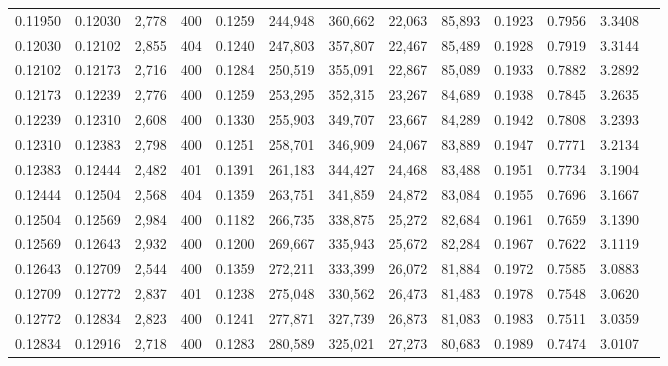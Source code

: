 \begin{tabular}{rrrrrrrrrrrrr}
0.11950 & 0.12030 & 2,778 & 400 &                                     0.1259 & 244,948 & 360,662 &  22,063 &  85,893 & 0.1923 & 0.7956 & 3.3408 \\
0.12030 & 0.12102 & 2,855 & 404 &                                     0.1240 & 247,803 & 357,807 &  22,467 &  85,489 & 0.1928 & 0.7919 & 3.3144 \\
0.12102 & 0.12173 & 2,716 & 400 &                                     0.1284 & 250,519 & 355,091 &  22,867 &  85,089 & 0.1933 & 0.7882 & 3.2892 \\
0.12173 & 0.12239 & 2,776 & 400 &                                     0.1259 & 253,295 & 352,315 &  23,267 &  84,689 & 0.1938 & 0.7845 & 3.2635 \\
0.12239 & 0.12310 & 2,608 & 400 &                                     0.1330 & 255,903 & 349,707 &  23,667 &  84,289 & 0.1942 & 0.7808 & 3.2393 \\
0.12310 & 0.12383 & 2,798 & 400 &                                     0.1251 & 258,701 & 346,909 &  24,067 &  83,889 & 0.1947 & 0.7771 & 3.2134 \\
0.12383 & 0.12444 & 2,482 & 401 &                                     0.1391 & 261,183 & 344,427 &  24,468 &  83,488 & 0.1951 & 0.7734 & 3.1904 \\
0.12444 & 0.12504 & 2,568 & 404 &                                     0.1359 & 263,751 & 341,859 &  24,872 &  83,084 & 0.1955 & 0.7696 & 3.1667 \\
0.12504 & 0.12569 & 2,984 & 400 &                                     0.1182 & 266,735 & 338,875 &  25,272 &  82,684 & 0.1961 & 0.7659 & 3.1390 \\
0.12569 & 0.12643 & 2,932 & 400 &                                     0.1200 & 269,667 & 335,943 &  25,672 &  82,284 & 0.1967 & 0.7622 & 3.1119 \\
0.12643 & 0.12709 & 2,544 & 400 &                                     0.1359 & 272,211 & 333,399 &  26,072 &  81,884 & 0.1972 & 0.7585 & 3.0883 \\
0.12709 & 0.12772 & 2,837 & 401 &                                     0.1238 & 275,048 & 330,562 &  26,473 &  81,483 & 0.1978 & 0.7548 & 3.0620 \\
0.12772 & 0.12834 & 2,823 & 400 &                                     0.1241 & 277,871 & 327,739 &  26,873 &  81,083 & 0.1983 & 0.7511 & 3.0359 \\
0.12834 & 0.12916 & 2,718 & 400 &                                     0.1283 & 280,589 & 325,021 &  27,273 &  80,683 & 0.1989 & 0.7474 & 3.0107 \\

\end{tabular}
